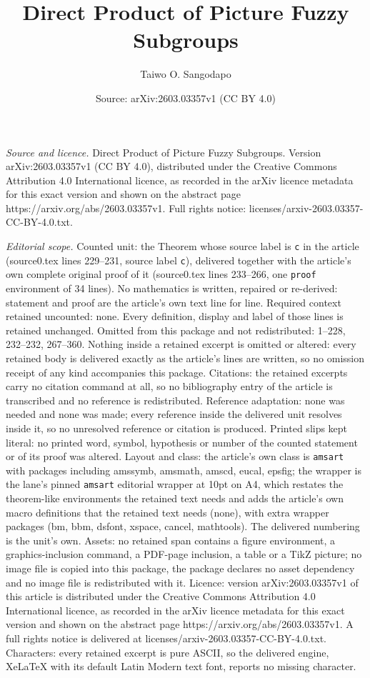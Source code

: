 \documentclass[10pt,a4paper]{amsart}
\title[Direct Product of Picture Fuzzy Subgroups]{Direct Product of Picture Fuzzy Subgroups}
\author{Taiwo O. Sangodapo}
\date{Source: arXiv:2603.03357v1 (CC BY 4.0)}
\begin{document}
\maketitle

\noindent\emph{Source and licence.} Direct Product of Picture Fuzzy Subgroups. Version arXiv:2603.03357v1 (CC BY 4.0), distributed under the Creative Commons Attribution 4.0 International licence, as recorded in the arXiv licence metadata for this exact version and shown on the abstract page https://arxiv.org/abs/2603.03357v1. Full rights notice: licenses/arxiv-2603.03357-CC-BY-4.0.txt.\par\smallskip

\noindent\textit{Editorial scope.} Counted unit: the Theorem whose source label is \texttt{c} in the article (source0.tex lines 229--231, source label \texttt{c}), delivered together with the article's own complete original proof of it (source0.tex lines 233--266, one \texttt{proof} environment of 34 lines). No mathematics is written, repaired or re-derived: statement and proof are the article's own text line for line. Required context retained uncounted: none. Every definition, display and label of those lines is retained unchanged. Omitted from this package and not redistributed: 1--228, 232--232, 267--360. Nothing inside a retained excerpt is omitted or altered: every retained body is delivered exactly as the article's lines are written, so no omission receipt of any kind accompanies this package. Citations: the retained excerpts carry no citation command at all, so no bibliography entry of the article is transcribed and no reference is redistributed. Reference adaptation: none was needed and none was made; every reference inside the delivered unit resolves inside it, so no unresolved reference or citation is produced. Printed slips kept literal: no printed word, symbol, hypothesis or number of the counted statement or of its proof was altered. Layout and class: the article's own class is \texttt{amsart} with packages including amssymb, amsmath, amscd, eucal, epsfig; the wrapper is the lane's pinned \texttt{amsart} editorial wrapper at 10pt on A4, which restates the theorem-like environments the retained text needs and adds the article's own macro definitions that the retained text needs (none), with extra wrapper packages (bm, bbm, dsfont, xspace, cancel, mathtools). The delivered numbering is the unit's own. Assets: no retained span contains a figure environment, a graphics-inclusion command, a PDF-page inclusion, a table or a TikZ picture; no image file is copied into this package, the package declares no asset dependency and no image file is redistributed with it. Licence: version arXiv:2603.03357v1 of this article is distributed under the Creative Commons Attribution 4.0 International licence, as recorded in the arXiv licence metadata for this exact version and shown on the abstract page https://arxiv.org/abs/2603.03357v1. A full rights notice is delivered at licenses/arxiv-2603.03357-CC-BY-4.0.txt. Characters: every retained excerpt is pure ASCII, so the delivered engine, XeLaTeX with its default Latin Modern text font, reports no missing character.
\end{document}

